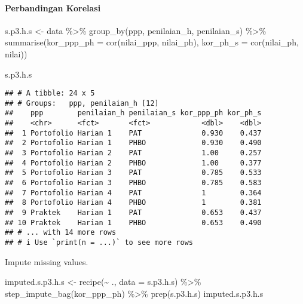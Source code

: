 \documentclass[
]{article}
\newenvironment{Shaded}{\begin{snugshade}}{\end{snugshade}}
\newcommand{\AttributeTok}[1]{\textcolor[rgb]{0.77,0.63,0.00}{#1}}
\newcommand{\FunctionTok}[1]{\textcolor[rgb]{0.00,0.00,0.00}{#1}}
\newcommand{\NormalTok}[1]{#1}
\newcommand{\OtherTok}[1]{\textcolor[rgb]{0.56,0.35,0.01}{#1}}
\newcommand{\SpecialCharTok}[1]{\textcolor[rgb]{0.00,0.00,0.00}{#1}}
\begin{document}
\hypertarget{perbandingan-korelasi}{%
\paragraph{Perbandingan Korelasi}\label{perbandingan-korelasi}}

\begin{Shaded}
\begin{Highlighting}[]
\NormalTok{s.p3.h.s }\OtherTok{\textless{}{-}}
\NormalTok{data }\SpecialCharTok{\%\textgreater{}\%} 
  \FunctionTok{group\_by}\NormalTok{(ppp, penilaian\_h, penilaian\_s) }\SpecialCharTok{\%\textgreater{}\%} 
  \FunctionTok{summarise}\NormalTok{(}\AttributeTok{kor\_ppp\_ph =} \FunctionTok{cor}\NormalTok{(nilai\_ppp, nilai\_ph),}
            \AttributeTok{kor\_ph\_s =} \FunctionTok{cor}\NormalTok{(nilai\_ph, nilai))}

\NormalTok{s.p3.h.s}
\end{Highlighting}
\end{Shaded}

\begin{verbatim}
## # A tibble: 24 x 5
## # Groups:   ppp, penilaian_h [12]
##    ppp        penilaian_h penilaian_s kor_ppp_ph kor_ph_s
##    <chr>      <fct>       <fct>            <dbl>    <dbl>
##  1 Portofolio Harian 1    PAT              0.930    0.437
##  2 Portofolio Harian 1    PHBO             0.930    0.490
##  3 Portofolio Harian 2    PAT              1.00     0.257
##  4 Portofolio Harian 2    PHBO             1.00     0.377
##  5 Portofolio Harian 3    PAT              0.785    0.533
##  6 Portofolio Harian 3    PHBO             0.785    0.583
##  7 Portofolio Harian 4    PAT              1        0.364
##  8 Portofolio Harian 4    PHBO             1        0.381
##  9 Praktek    Harian 1    PAT              0.653    0.437
## 10 Praktek    Harian 1    PHBO             0.653    0.490
## # ... with 14 more rows
## # i Use `print(n = ...)` to see more rows
\end{verbatim}

Impute missing values.

\begin{Shaded}
\begin{Highlighting}[]
\NormalTok{imputed.s.p3.h.s }\OtherTok{\textless{}{-}}
  \FunctionTok{recipe}\NormalTok{(}\SpecialCharTok{\textasciitilde{}}\NormalTok{ ., }\AttributeTok{data =}\NormalTok{ s.p3.h.s) }\SpecialCharTok{\%\textgreater{}\%}
  \FunctionTok{step\_impute\_bag}\NormalTok{(kor\_ppp\_ph) }\SpecialCharTok{\%\textgreater{}\%} 
  \FunctionTok{prep}\NormalTok{(s.p3.h.s)}
\NormalTok{imputed.s.p3.h.s }
\end{Highlighting}
\end{Shaded}
\end{document}
